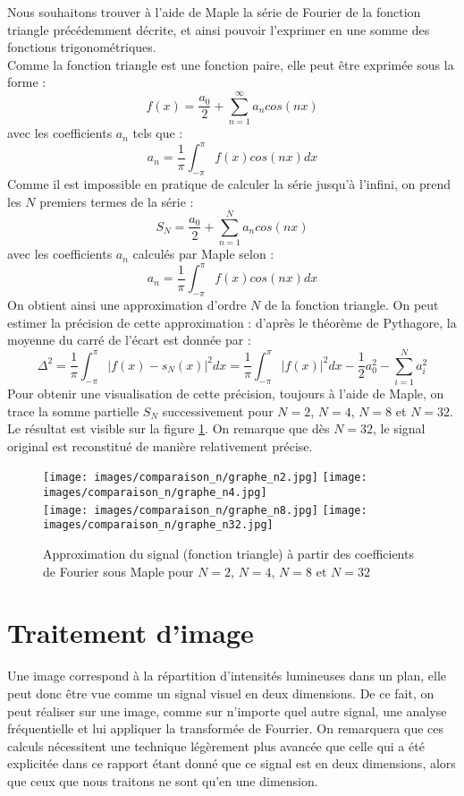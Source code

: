 \documentclass{report}
\begin{document}
	Nous souhaitons trouver à l’aide de Maple la série de Fourier de la fonction triangle précédemment décrite, et ainsi pouvoir l’exprimer en une somme des fonctions trigonométriques.\\
	Comme la fonction triangle est une fonction paire, elle peut être exprimée sous la forme :
	\[
		f(x) = \frac{a_0}{2} + \sum^\infty_{n=1} a_n cos(nx)
	\]
	avec les coefficients $a_n$ tels que :
	\[
		a_n = \frac{1}{\pi} \int^{\pi}_{-\pi} f(x) cos(nx) dx
	\]
	Comme il est impossible en pratique de calculer la série jusqu'à l'infini, on prend les $N$ premiers termes de la série :
	\[
		S_N = \frac{a_0}{2} + \sum^N_{n=1} a_n cos(nx)
	\]
	avec les coefficients $a_n$ calculés par Maple selon :
	\[
		a_n = \frac{1}{\pi} \int^{\pi}_{-\pi} f(x) cos(nx) dx
	\]
	On obtient ainsi une approximation d'ordre $N$ de la fonction triangle. On peut estimer la précision de cette approximation : d’après le théorème de Pythagore, la moyenne du carré de l’écart est donnée par :
	\[
		\Delta^2 	= \frac{1}{\pi} \int^{\pi}_{-\pi} | f(x) - s_N(x) |^2 dx
					= \frac{1}{\pi} \int^{\pi}_{-\pi} | f(x) |^2 dx - \frac{1}{2} a^2_0 - \sum^N_{i=1} a_i^2
	\]
	Pour obtenir une visualisation de cette précision, toujours à l'aide de Maple, on trace la somme partielle $S_N$ successivement pour $N=2$, $N=4$, $N=8$ et $N=32$. Le résultat est visible sur la figure \ref{comparaisonGraphesTriangle}. On remarque que dès $N=32$, le signal original est reconstitué de manière relativement précise.
	\begin{figure}
		\texttt{[image: images/comparaison\_n/graphe\_n2.jpg]}
		\texttt{[image: images/comparaison\_n/graphe\_n4.jpg]}\\
		\texttt{[image: images/comparaison\_n/graphe\_n8.jpg]}
		\texttt{[image: images/comparaison\_n/graphe\_n32.jpg]}
	\caption{Approximation du signal (fonction triangle) à partir des coefficients de Fourier sous Maple pour $N=2$, $N=4$, $N=8$ et $N=32$}
	\label{comparaisonGraphesTriangle}
	\end{figure}

	\clearpage{}


	\section{Traitement d'image}
	Une image correspond à la répartition d’intensités lumineuses dans un plan, elle peut donc être vue comme un signal visuel en deux dimensions. De ce fait, on peut réaliser sur une image, comme sur n’importe quel autre signal, une analyse fréquentielle et lui appliquer la transformée de Fourrier. On remarquera que ces calculs nécessitent une technique légèrement plus avancée que celle qui a été explicitée dans ce rapport étant donné que ce signal est en deux dimensions, alors que ceux que nous traitons ne sont qu’en une dimension.  
\end{document}
